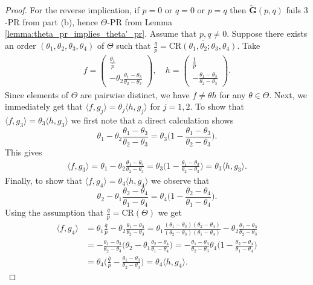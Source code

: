 \documentclass[reqno,a4paper,11pt]{amsart}
\numberwithin{equation}{section}
\newcommand\1{\mathds{1}}
\newcommand{\cratio}{{\mathrm{CR}}}
\begin{document}
\begin{proof}
    For the reverse implication, if $p=0$ or $q=0$ or $p=q$ then $\tilde{\mathbf{G}}(p,q)$ fails $3$-PR from part (b), hence $\Theta$-PR from Lemma \ref{lemma:theta_pr_implies_theta'_pr}. Assume that $p,q\neq 0$. Suppose there exists an order $(\theta_1,\theta_2,\theta_3,\theta_4)$ of $\Theta$ such that $\frac{q}{p}=\overline{\cratio(\theta_1,\theta_2;\theta_3,\theta_4)}$. Take
          \begin{align*}
            f=\begin{pmatrix}
            \frac{\theta_1}{\overline{p}}\\
            -\theta_2\frac{\theta_1-\theta_3}{\theta_2-\theta_3}
            \end{pmatrix}, \quad
            h=\begin{pmatrix}
            \frac{1}{\overline{p}}\\
            -\frac{\theta_1-\theta_3}{\theta_2-\theta_3}
            \end{pmatrix}.
            \end{align*}
    Since elements of $\Theta$ are pairwise distinct, we have $f\neq \theta h$ for any $\theta \in \Theta$. Next, we immediately get that $\langle f,g_j\rangle = \theta_j\langle h,g_j\rangle$ for $j=1,2$. To show that $\langle f,g_3\rangle=\theta_3\langle h,g_3\rangle$ we first note that a direct calculation shows 
    $$\theta_1-\theta_2\frac{\theta_1-\theta_3}{\theta_2-\theta_3} = \theta_3\Big(1-\frac{\theta_1-\theta_3}{\theta_2-\theta_3}\Big).$$
    This gives
    \begin{align*}
        \langle f,g_3\rangle = \theta_1-\theta_2\frac{\theta_1-\theta_3}{\theta_2-\theta_3} = \theta_3\Big(1-\frac{\theta_1-\theta_3}{\theta_2-\theta_3}\Big) = \theta_3\langle h,g_3\rangle. 
    \end{align*}
    Finally, to show that $\langle f,g_4\rangle = \theta_4\langle h,g_4\rangle$ we observe that 
    $$\theta_2 - \theta_1\frac{\theta_2-\theta_4}{\theta_1-\theta_4} = \theta_4\Big(1-\frac{\theta_2-\theta_4}{\theta_1-\theta_4}\Big).$$
    Using the assumption that $\frac{\overline{q}}{\overline{p}}=\cratio(\Theta)$ we get
    \begin{align*}
        \langle f,g_4\rangle &= \theta_1 \frac{\overline{q}}{\overline{p}} - \theta_2 \frac{\theta_1-\theta_3}{\theta_2-\theta_3} = \theta_1 \frac{(\theta_1-\theta_3)(\theta_2-\theta_4)}{(\theta_2-\theta_3)(\theta_1-\theta_4)} - \theta_2\frac{\theta_1-\theta_3}{\theta_2-\theta_3}\\
        &=-\frac{\theta_1-\theta_3}{\theta_2-\theta_3}\Big(\theta_2 - \theta_1\frac{\theta_2-\theta_4}{\theta_1-\theta_4}\Big) = -\frac{\theta_1-\theta_3}{\theta_2-\theta_3}\theta_4\Big(1-\frac{\theta_2-\theta_4}{\theta_1-\theta_4}\Big)\\
        &=\theta_4 \Big(\frac{\overline{q}}{\overline{p}} - \frac{\theta_1-\theta_3}{\theta_2-\theta_3}\Big) = \theta_4\langle h,g_4\rangle.
    \end{align*}
\end{proof}
\end{document}
